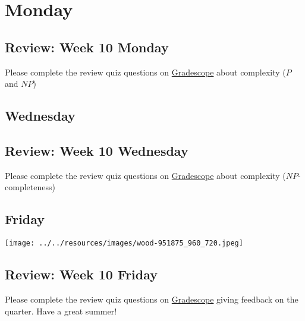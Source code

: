 

\section*{Monday}



\subsection*{Review: Week 10 Monday}

Please complete the review quiz questions on \href{http://gradescope.com}{Gradescope} about 
complexity ($P$ and $NP$)


\newpage
\subsection*{Wednesday}



\subsection*{Review: Week 10 Wednesday}

Please complete the review quiz questions on \href{http://gradescope.com}{Gradescope} about 
complexity ($NP$-completeness)

\newpage
\subsection*{Friday}



\newpage


\vfill

\begin{center}
\texttt{[image: ../../resources/images/wood-951875\_960\_720.jpeg]}
\end{center}

\vfill

\subsection*{Review: Week 10 Friday}

Please complete the review quiz questions on \href{http://gradescope.com}{Gradescope} giving feedback on the quarter. 
Have a great summer!
